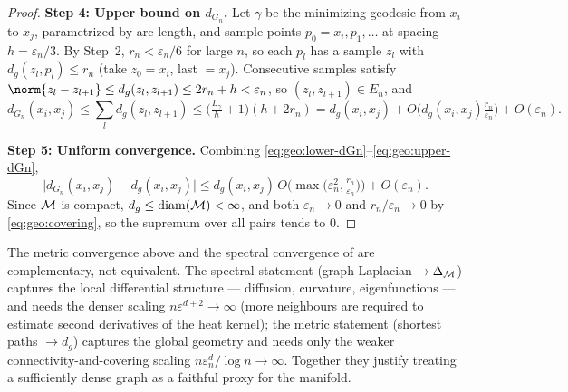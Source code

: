 \begin{proof}
\textbf{Step 4: Upper bound on $d_{G_n}$.} Let $\gamma$ be the minimizing
geodesic from $x_i$ to $x_j$, parametrized by arc length, and sample points
$p_0 = x_i, p_1, \dots$ at spacing $h = \varepsilon_n/3$. By Step~2,
$r_n < \varepsilon_n/6$ for large $n$, so each $p_l$ has a sample $z_l$ with
$d_g(z_l, p_l) \le r_n$ (take $z_0 = x_i$, last $= x_j$). Consecutive samples
satisfy $\norm{z_l - z_{l+1}} \le d_g(z_l, z_{l+1}) \le 2r_n + h < \varepsilon_n$,
so $(z_l, z_{l+1}) \in E_n$, and
\begin{equation}
\label{eq:geo:upper-dGn}
  d_{G_n}(x_i, x_j) \le \sum_l d_g(z_l, z_{l+1})
    \le \big(\tfrac{L_\gamma}{h} + 1\big)(h + 2r_n)
    = d_g(x_i, x_j) + O\!\Big(d_g(x_i,x_j)\tfrac{r_n}{\varepsilon_n}\Big)
      + O(\varepsilon_n).
\end{equation}

\textbf{Step 5: Uniform convergence.} Combining
\eqref{eq:geo:lower-dGn}--\eqref{eq:geo:upper-dGn},
\[
  \big| d_{G_n}(x_i,x_j) - d_g(x_i,x_j)\big|
    \le d_g(x_i,x_j)\, O\!\Big(\max\big(\varepsilon_n^2, \tfrac{r_n}{\varepsilon_n}\big)\Big)
      + O(\varepsilon_n).
\]
Since $\mathcal{M}$ is compact, $d_g \le \operatorname{diam}(\mathcal{M}) < \infty$, and both
$\varepsilon_n \to 0$ and $r_n/\varepsilon_n \to 0$ by \eqref{eq:geo:covering},
so the supremum over all pairs tends to $0$.
\end{proof}

\begin{remark}
\label{rem:geo:two-convergences}
The metric convergence above and the spectral convergence of 
are complementary, not equivalent. The spectral statement
(graph Laplacian $\to \Delta_{\mathcal{M}}$) captures the local differential structure ---
diffusion, curvature, eigenfunctions --- and needs the denser scaling
$n\varepsilon^{d+2} \to \infty$ (more neighbours are required to estimate second
derivatives of the heat kernel); the metric statement
(shortest paths $\to d_g$) captures the global geometry and needs only the
weaker connectivity-and-covering scaling
$n\varepsilon_n^d/\log n \to \infty$. Together they justify treating a
sufficiently dense graph as a faithful proxy for the manifold.
\end{remark}

